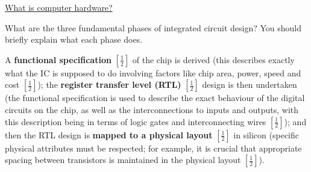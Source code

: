\documentclass{exam}
\begin{document}
\begin{center}
	\underline{\huge What is computer hardware?}
\end{center}
\begin{questions}
\question[3] What are the three fundamental phases of integrated circuit design?
You should briefly explain what each phase does. 

\begin{solution}[2in]
A \textbf{functional specification} $[\frac{1}{2}]$ of the chip is derived (this describes
exactly what the IC is supposed to do involving factors like chip area,
power, speed and cost $[\frac{1}{2}]$); the \textbf{register transfer level (RTL)} $[\frac{1}{2}]$ design
is then undertaken (the functional specification is used to describe
the exact behaviour of the digital circuits on the chip, as well as the
interconnections to inputs and outputs, with this description being in
terms of logic gates and interconnecting wires $[\frac{1}{2}]$); and then the RTL
design is \textbf{mapped to a physical layout} $[\frac{1}{2}]$ in silicon (specific physical
attributes must be respected; for example, it is crucial that appropriate
spacing between transistors is maintained in the physical layout $[\frac{1}{2}]$).
\end{solution}


\end{questions}
\end{document}
